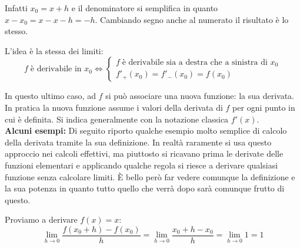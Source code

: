 Infatti $x_0 = x + h$ e il denominatore si semplifica in quanto $x - x_0 = x - x - h = -h$. Cambiando segno anche al numerato il risultato è lo stesso.


L'idea è la stessa dei limiti:
\begin{equation*}
	f \; \text{è derivabile in } x_0 \iff
	\begin{cases*}
		f \; \text{è derivabile sia a destra che a sinistra di } x_0\\
		f'_+(x_0) = f'_-(x_0) = f(x_0)
	\end{cases*}
\end{equation*}

In questo ultimo caso, ad $f$ si può associare una nuova funzione: la sua derivata. In pratica la nuova funzione assume i valori della derivata di $f$ per ogni punto in cui è definita. Si indica generalmente con la notazione classica $f'(x)$.\\

\textbf{Alcuni esempi:} Di seguito riporto qualche esempio molto semplice di calcolo della derivata tramite la sua definizione. In realtà raramente si usa questo approccio nei calcoli effettivi, ma piuttosto si ricavano prima le derivate delle funzioni elementari e applicando qualche regola si riesce a derivare qualsiasi funzione senza calcolare limiti. È bello però far vedere comunque la definizione e la sua potenza in quanto tutto quello che verrà dopo sarà comunque frutto di questo.

Proviamo a derivare $f(x) = x$:
\begin{equation*}
	\lim_{h \to 0} \dfrac{f(x_0 + h) - f(x_0)}{h} = \lim_{h \to 0} \dfrac{x_0 + h -x_0}{h} = \lim_{h \to 0} 1 = 1
\end{equation*}

